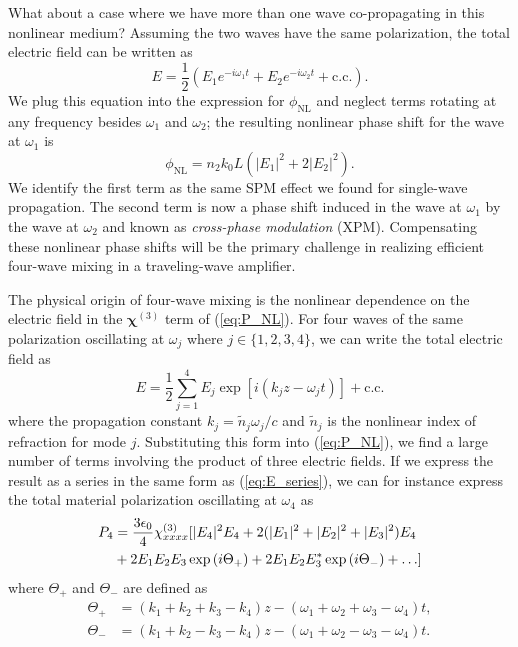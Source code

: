 What about a case where we have more than one wave co-propagating in this nonlinear medium?  Assuming the two waves have the same polarization, the total electric field can be written as
\begin{equation}
E = \frac{1}{2} ( E_1 e^{-i \omega_1 t} + E_2 e^{-i \omega_2 t} + \textrm{c.c.}).
\end{equation}
We plug this equation into the expression for $\phi_{\textrm{NL}}$ and neglect terms rotating at any frequency besides $\omega_1$ and $\omega_2$; the resulting nonlinear phase shift for the wave at $\omega_1$ is
\begin{equation}
\phi_{\textrm{NL}} = n_2 k_0 L ( |E_1|^2 + 2 |E_2|^2).
\end{equation}
We identify the first term as the same SPM effect we found for single-wave propagation.  The second term is now a phase shift induced in the wave at $\omega_1$ by the wave at $\omega_2$ and known as \textit{cross-phase modulation} (XPM).  Compensating these nonlinear phase shifts will be the primary challenge in realizing efficient four-wave mixing in a traveling-wave amplifier.

The physical origin of four-wave mixing is the nonlinear dependence on the electric field in the $\boldsymbol{\chi}^{(3)}$ term of (\ref{eq:P_NL}).    For four waves of the same polarization oscillating at $\omega_j$ where $j \in \{1,2,3,4\}$, we can write the total electric field as
\begin{equation}
E = \frac{1}{2} \sum^4_{j=1} E_j \exp{[i (k_j z - \omega_j t)]} +  \textrm{c.c.}
\label{eq:E_series}
\end{equation}
where the propagation constant $k_j = \tilde{n}_j \omega_j / c$ and $\tilde{n}_j$ is the nonlinear index of refraction for mode $j$.  Substituting this form into (\ref{eq:P_NL}), we find a large number of terms involving the product of three electric fields.  If we express the result as a series in the same form as (\ref{eq:E_series}), we can for instance express the total material polarization oscillating at $\omega_4$ as
\begin{align}
P_4 &= \frac{3 \epsilon_0}{4} \chi^{(3)}_{xxxx} [ |E_4|^2 E_4 + 2 (|E_1|^2 + |E_2|^2 + |E_3|^2)E_4 \notag \\
&+2E_1 E_2 E_3 \exp{(i \Theta_+)} + 2 E_1 E_2 E_3^* \exp{(i \Theta_-)} + \hdots]
\label{eq:fwm_prods}
\end{align}
where $\Theta_+$ and $\Theta_-$ are defined as
\begin{align}
\Theta_+ &= (k_1 + k_2 + k_3 - k_4)z - (\omega_1 + \omega_2 + \omega_3 - \omega_4)t,
\\ \Theta_- &= (k_1 + k_2 - k_3 - k_4)z - (\omega_1 + \omega_2 - \omega_3 - \omega_4)t.
\end{align}

